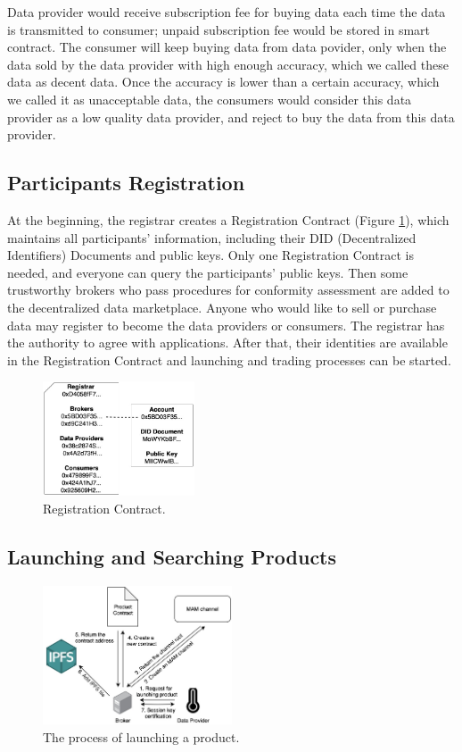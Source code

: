 \documentclass[journal,10pt,a4paper]{IEEEtran}
\begin{document}
Data provider would receive subscription fee for buying data each time the data is transmitted to consumer; unpaid subscription fee would be stored in smart contract. The consumer will keep buying data from data povider, only when the data sold by the data provider with high enough accuracy, which we called these data as decent data.
Once the accuracy is lower than a certain accuracy, which we called it as unacceptable data, the consumers would consider this data provider as a low quality data provider, and reject to buy the data from this data provider.


\subsection{Participants Registration}
At the beginning, the registrar creates a Registration Contract (Figure \ref{fig:registration_contract}), which maintains all participants' information, including their DID (Decentralized Identifiers) Documents and public keys. Only one Registration Contract is needed, and everyone can query the participants' public keys. Then some trustworthy brokers who pass procedures for conformity assessment are added to the decentralized data marketplace. Anyone who would like to sell or purchase data may register to become the data providers or consumers. The registrar has the authority to agree with applications. After that, their identities are available in the Registration Contract and launching and trading processes can be started.

\begin{figure}[h]
    \centering
    \includegraphics[width=0.4\textwidth]{registration_contract}
    \caption{Registration Contract.}
    \label{fig:registration_contract}
\end{figure}

\subsection{Launching and Searching Products}

\begin{figure}[h]
    \centering
    \includegraphics[width=0.5\textwidth]{launching_product}
    \caption{The process of launching a product.}
    \label{fig:launching_product}
\end{figure}
\end{document}
